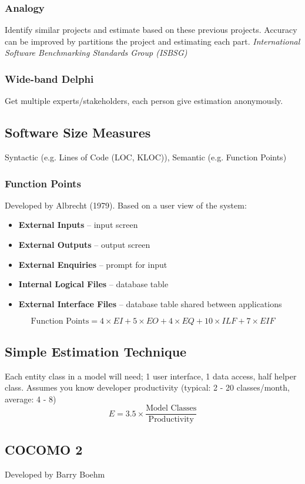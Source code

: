 \documentclass[10pt,a4paper]{article}
\begin{document}
\begin{landscape}
\begin{multicols}{3}
\subsubsection{Analogy}
Identify similar projects and estimate based on these previous projects. Accuracy can be improved by partitions the project and estimating each part. \textit{International Software Benchmarking Standards Group (ISBSG)}
\subsubsection{Wide-band Delphi}
Get multiple experts/stakeholders, each person give estimation anonymously.
\subsection{Software Size Measures}
Syntactic (e.g. Lines of Code (LOC, KLOC)), Semantic (e.g. Function Points)
\subsubsection{Function Points}
Developed by Albrecht (1979). Based on a user view of the system:
\begin{itemize}
    \item \textbf{External Inputs} -- input screen
    \item \textbf{External Outputs} -- output screen
    \item \textbf{External Enquiries} -- prompt for input
    \item \textbf{Internal Logical Files} -- database table
    \item \textbf{External Interface Files} -- database table shared between applications
\end{itemize}
\begin{equation*}
    \text{Function Points} = 4\times EI+5\times EO+4\times EQ+10\times ILF+7\times EIF
\end{equation*}
\subsection{Simple Estimation Technique}
Each entity class in a model will need; 1 user interface, 1 data access, half helper class. Assumes you know developer productivity (typical: 2 - 20 classes/month, average: 4 - 8)
\begin{equation*}
    E=3.5\times\frac{\text{Model Classes}}{\text{Productivity}}
\end{equation*}
\subsection{COCOMO 2}
Developed by Barry Boehm

\end{multicols}
\end{landscape}
\end{document}
